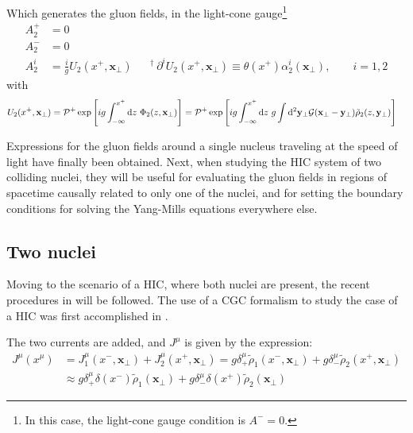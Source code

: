 Which generates the gluon fields, in the light-cone gauge\footnote{In this case, the light-cone gauge condition is $A^- = 0$.}
\begin{subequations}
\begin{alignat}{2}
	A^+_2 & = 0 && \\
	A^-_2 & = 0 && \\
	A^i_2 & = \frac{i}{g} U_2(x^+,\mathbf{x}_\perp)&& ^\dagger ~  \partial^i U_2(x^+,\mathbf{x}_\perp) \equiv \theta(x^+) \alpha_2^i(\mathbf{x}_\perp), \qquad i = 1,2                                     
\end{alignat}
\label{eq:A_lc_one_nucleus_2}
\end{subequations}
with
\begin{align}
	U_2(x^+, \mathbf{x}_\perp) & =
	\mathcal{P}^+ \exp  \Bigg[ig \int_{-\infty}^{x^+} \mathop{}\!\mathrm{d} z ~ \Phi_2 (z, \mathbf{x}_\perp) \Bigg] \nonumber  
	=  \mathcal{P}^+ \exp  \Bigg[ig \int_{-\infty}^{x^+} \mathop{}\!\mathrm{d} z ~  g \int \mathop{}\!\mathrm{d}^2 \mathbf{y}_\perp \mathcal{G}(\mathbf{x_\perp} - \mathbf{y_\perp}) \tilde{\rho}_2(z,\mathbf{y}_\perp) \Bigg] \nonumber 
\end{align}

Expressions for the gluon fields around a single nucleus traveling at the speed of light have finally been obtained. Next, when studying the \gls{HIC} system of two colliding nuclei, they will be useful for evaluating the gluon fields in regions of spacetime causally related to only one of the nuclei, and for setting the boundary conditions for solving the Yang-Mills equations everywhere else.

\subsection{Two nuclei}


Moving to the scenario of a HIC, where both nuclei are present, the recent procedures in \cite{Albacete_2019,Guerrero_Rodr_guez_2021} will be followed.
The use of a \gls{CGC} formalism to study the case of a \gls{HIC} was first accomplished in \cite{Kovner_1995}.

The two currents are added, and $J^\mu$ is given by the expression:
\begin{equation}
\begin{split}
	J^\mu(x^\mu) & = J_1^\mu(x^-,\mathbf{x}_\perp) + J_2^\mu(x^+, \mathbf{x}_\perp) = g \delta^{\mu}_+ \tilde{\rho}_1(x^-,\mathbf{x}_\perp) + g \delta^{\mu}_- \tilde{\rho}_2(x^+,\mathbf{x}_\perp) \\ 
	& \approx g \delta^{\mu}_+ \delta(x^-) \tilde{\rho}_1(\mathbf{x}_\perp) + g \delta^{\mu}_- \delta(x^+) \tilde{\rho}_2(\mathbf{x}_\perp)
\end{split}
\label{eq:full_J}
\end{equation}

